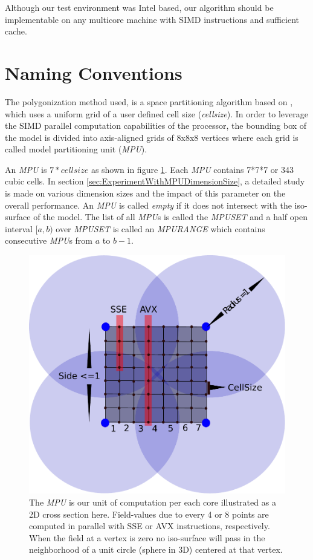 Although our test environment was Intel based, our algorithm should be implementable on any
multicore machine with SIMD instructions and sufficient cache.

\section{Naming Conventions}\label{sec:naming}
The polygonization method used, is a space partitioning algorithm based on \cite{Wyvill1986}, which uses a uniform grid of a user 
defined cell size (\textit{cellsize}). In order to leverage the SIMD parallel computation capabilities of the processor, the bounding 
box of the model is divided into axis-aligned grids of 8x8x8 vertices where each grid is called  model partitioning unit (\textit{MPU}). 

An \textit{MPU} is $7*cellsize$ as shown in figure \ref{fig:MPU}. Each \textit{MPU} contains 7*7*7 or 343 cubic cells. 
In section \ref{sec:ExperimentWithMPUDimensionSize}, a detailed study is made on various dimension sizes and the impact
of this parameter on the overall performance.
An \textit{MPU} is called \textit{empty} if it does not intersect with the iso-surface of the model. 
The list of all \textit{MPU}s is called the \textit{MPUSET} and a half open interval 
$[a, b)$ over \textit{MPUSET} is called an \textit{MPURANGE} which contains consecutive \textit{MPU}s from $a$ to $b-1$.
 
\begin{figure}[H]
  \centering
  \includegraphics[width=0.7\linewidth]{figures/cpupoly/MPU.pdf}
  \caption{\label{fig:MPU}
  {The \textit{MPU} is our unit of computation per each core illustrated as a 2D cross section here. 
  Field-values due to every 4 or 8 points are computed in parallel with SSE or AVX instructions, respectively. 
  When the field at a vertex is zero no iso-surface will pass in the neighborhood of a unit circle (sphere in 3D) centered at that vertex.}
}
\end{figure}


